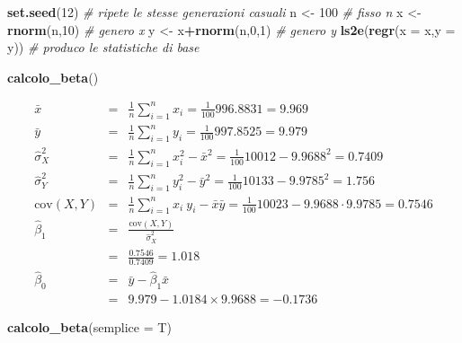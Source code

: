 \documentclass[
  11pt,
]{book}
\newenvironment{Shaded}{\begin{snugshade}}{\end{snugshade}}
\newcommand{\AttributeTok}[1]{\textcolor[rgb]{0.13,0.29,0.53}{#1}}
\newcommand{\CommentTok}[1]{\textcolor[rgb]{0.56,0.35,0.01}{\textit{#1}}}
\newcommand{\DecValTok}[1]{\textcolor[rgb]{0.00,0.00,0.81}{#1}}
\newcommand{\FunctionTok}[1]{\textcolor[rgb]{0.13,0.29,0.53}{\textbf{#1}}}
\newcommand{\NormalTok}[1]{#1}
\newcommand{\OtherTok}[1]{\textcolor[rgb]{0.56,0.35,0.01}{#1}}
\newcommand{\SpecialCharTok}[1]{\textcolor[rgb]{0.81,0.36,0.00}{\textbf{#1}}}
\theoremstyle{mytheoremstyle}
\theoremstyle{mydefstyle}
\begin{document}
\begin{Shaded}
\begin{Highlighting}[]
\FunctionTok{set.seed}\NormalTok{(}\DecValTok{12}\NormalTok{)                 }\CommentTok{\# ripete le stesse generazioni casuali}
\NormalTok{n }\OtherTok{\textless{}{-}} \DecValTok{100}                     \CommentTok{\# fisso n}
\NormalTok{x }\OtherTok{\textless{}{-}} \FunctionTok{rnorm}\NormalTok{(n,}\DecValTok{10}\NormalTok{)             }\CommentTok{\# genero x}
\NormalTok{y }\OtherTok{\textless{}{-}}\NormalTok{ x}\SpecialCharTok{+}\FunctionTok{rnorm}\NormalTok{(n,}\DecValTok{0}\NormalTok{,}\DecValTok{1}\NormalTok{)          }\CommentTok{\# genero y}
\FunctionTok{ls2e}\NormalTok{(}\FunctionTok{regr}\NormalTok{(}\AttributeTok{x =}\NormalTok{ x,}\AttributeTok{y =}\NormalTok{ y))    }\CommentTok{\# produco le statistiche di base}

\FunctionTok{calcolo\_beta}\NormalTok{()}
\end{Highlighting}
\end{Shaded}

\begin{eqnarray*}
           \bar x &=&\frac 1 n\sum_{i=1}^n x_i = \frac {1}{ 100 }  996.8831 =  9.969 \\
           \bar y &=&\frac 1 n\sum_{i=1}^n y_i = \frac {1}{ 100 }  997.8525 =  9.979 \\
           \hat\sigma_X^2&=&\frac 1 n\sum_{i=1}^n x_i^2-\bar x^2=\frac {1}{ 100 }  10012  - 9.9688 ^2= 0.7409 \\
           \hat\sigma_Y^2&=&\frac 1 n\sum_{i=1}^n y_i^2-\bar y^2=\frac {1}{ 100 }  10133  - 9.9785 ^2= 1.756 \\
           \text{cov}(X,Y)&=&\frac 1 n\sum_{i=1}^n x_i~y_i-\bar x\bar y=\frac {1}{ 100 }  10023 - 9.9688 \cdot 9.9785 = 0.7546 \\
           \hat\beta_1 &=& \frac{\text{cov}(X,Y)}{\hat\sigma_X^2} \\
                    &=& \frac{ 0.7546 }{ 0.7409 }  =  1.018 \\
           \hat\beta_0 &=& \bar y - \hat\beta_1 \bar x\\
                    &=&  9.979 - 1.0184 \times  9.9688 = -0.1736 
         \end{eqnarray*}

\begin{Shaded}
\begin{Highlighting}[]
\FunctionTok{calcolo\_beta}\NormalTok{(}\AttributeTok{semplice =}\NormalTok{ T)}
\end{Highlighting}
\end{Shaded}
\end{document}
